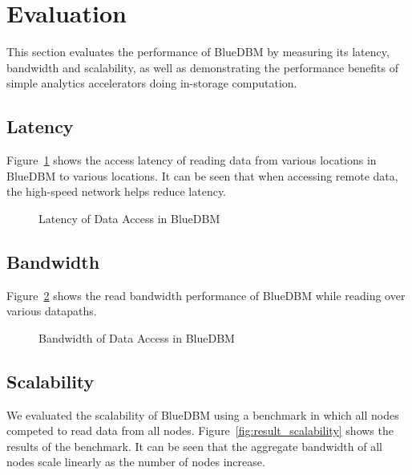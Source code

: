 \section{Evaluation}

This section evaluates the performance of BlueDBM by measuring its latency,
bandwidth and scalability, as well as demonstrating the performance benefits of
simple analytics accelerators doing in-storage computation.

\subsection{Latency}

Figure~\ref{fig:result_latency} shows the access latency of reading data from
various locations in BlueDBM to various locations. It can be seen that when
accessing remote data, the high-speed network helps reduce latency.

\begin{figure}[h]
	\begin{center}
	\caption{Latency of Data Access in BlueDBM}
	\label{fig:result_latency}
	\end{center}
\end{figure}
%
%


\subsection{Bandwidth}

Figure~\ref{fig:result_bandwidth} shows the read bandwidth performance of
BlueDBM while reading over various datapaths. 

\begin{figure}[h]
	\begin{center}
	\caption{Bandwidth of Data Access in BlueDBM}
	\label{fig:result_bandwidth}
	\end{center}
\end{figure}

\subsection{Scalability}

We evaluated the scalability of BlueDBM using a benchmark in which all nodes
competed to read data from all nodes. Figure~\ref{fig:result_scalability} shows
the results of the benchmark. It can be seen that the aggregate bandwidth of all
nodes scale linearly as the number of nodes increase.

